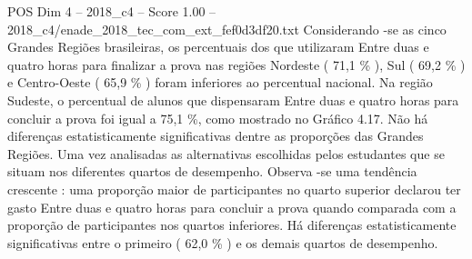 \begin{textsample}{POS Dim 4 – 2018\_c4 – Score 1.00 – 2018\_c4/enade\_2018\_tec\_com\_ext\_fef0d3df20.txt}
Considerando -se as cinco Grandes Regiões brasileiras, os percentuais dos que utilizaram Entre duas e quatro horas para finalizar a prova nas regiões Nordeste ( 71,1 \% ), Sul ( 69,2 \% ) e Centro-Oeste ( 65,9 \% ) foram inferiores ao percentual nacional.
Na região Sudeste, o percentual de alunos que dispensaram Entre duas e quatro horas para concluir a prova foi igual a 75,1 \%, como mostrado no Gráfico 4.17.
Não há diferenças estatisticamente significativas dentre as proporções das Grandes Regiões.
Uma vez analisadas as alternativas escolhidas pelos estudantes que se situam nos diferentes quartos de desempenho.
Observa -se uma tendência crescente : uma proporção maior de participantes no quarto superior declarou ter gasto Entre duas e quatro horas para concluir a prova quando comparada com a proporção de participantes nos quartos inferiores.
Há diferenças estatisticamente significativas entre o primeiro ( 62,0 \% ) e os demais quartos de desempenho.

\end{textsample}
